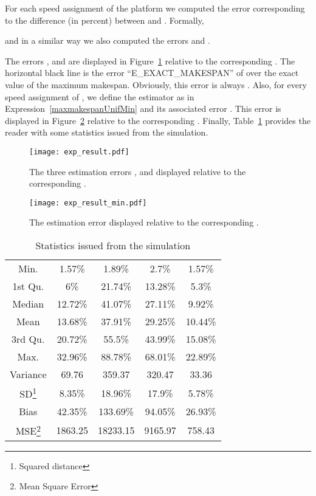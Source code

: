 \documentclass{article}
\newtheorem{validity test}{Validity Test}
\begin{document}
For each speed assignment of the platform we computed the error  corresponding to the difference (in percent) between  and . Formally, 

and in a similar way we also computed the errors  and .

The errors ,  and  are displayed in Figure~\ref{fig:Multimode:simulations_result_1} relative to the corresponding . The horizontal black line is the error ``E\_EXACT\_MAKESPAN'' of  over the exact value of the maximum makespan. Obviously, this error is always . Also, for every speed assignment of , we define the estimator  as in Expression~\ref{maxmakespanUnifMin} and its associated error . This error is displayed in Figure~\ref{fig:Multimode:simulations_result_2} relative to the corresponding . Finally, Table~\ref{tab:Multimode:simulations_outline} provides the reader with some statistics issued from the simulation. 

\begin{figure}
\texttt{[image: exp\_result.pdf]}
\caption{The three estimation errors ,  and  displayed relative to the corresponding .}
\label{fig:Multimode:simulations_result_1}
\end{figure}

\begin{figure}
\texttt{[image: exp\_result\_min.pdf]}
\caption{The estimation error  displayed relative to the corresponding .}
\label{fig:Multimode:simulations_result_2}
\end{figure}

\begin{table}[h!]
\centering
\begin{tabular}{| c | c | c | c | c |}
\hline
&  &  &  &  \\
\hline
Min. & 1.57\% & 1.89\% & 2.7\% & 1.57\% \\
\hline
1st Qu. & 6\% & 21.74\% & 13.28\% & 5.3\% \\
\hline
Median & 12.72\% & 41.07\% & 27.11\% & 9.92\% \\
\hline
Mean & 13.68\% & 37.91\% & 29.25\% & 10.44\% \\
\hline
3rd Qu. & 20.72\% & 55.5\% & 43.99\% & 15.08\% \\
\hline
Max. & 32.96\% & 88.78\% & 68.01\% & 22.89\% \\
\hline
Variance & 69.76 & 359.37 & 320.47 & 33.36 \\
\hline
SD\footnote{Squared distance} & 8.35\% & 18.96\% & 17.9\% & 5.78\% \\
\hline
Bias & 42.35\% & 133.69\% & 94.05\% & 26.93\% \\
\hline
MSE\footnote{Mean Square Error} & 1863.25 & 18233.15 & 9165.97 & 758.43 \\
\hline
\end{tabular}
\caption{Statistics issued from the simulation}
\label{tab:Multimode:simulations_outline}
\end{table}
\end{document}
